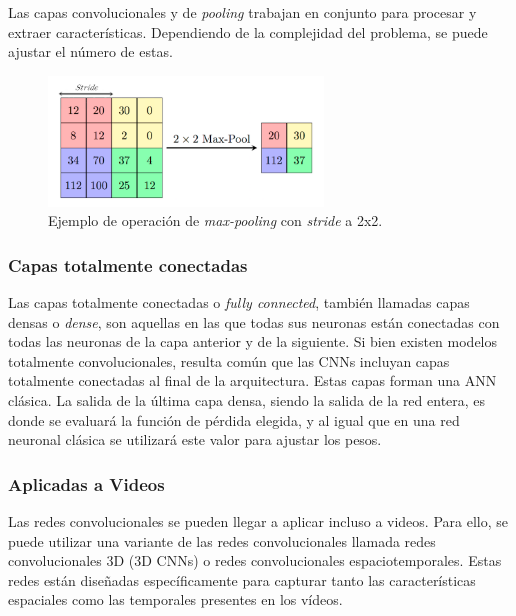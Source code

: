 Las capas convolucionales y de \emph{pooling} trabajan en conjunto para procesar y extraer 
características. 
Dependiendo de la complejidad del problema, se puede ajustar el número de estas.

\begin{figure}[htp]
  \begin{center}
    \includegraphics[width=0.65\textwidth]{imagenes/chapter2/MaxpoolSample.png}
  \end{center}

  \caption{
    Ejemplo de operación de \emph{max-pooling} con \emph{stride} a 2x2.
  }
  \label{fig:PoolingExample}
\end{figure}

\subsubsection{Capas totalmente conectadas}
Las capas totalmente conectadas o \emph{fully connected}, también llamadas 
capas densas o \emph{dense}, son aquellas en las que todas sus neuronas 
están conectadas con todas las neuronas de la capa anterior y de la
siguiente. Si bien existen modelos totalmente convolucionales, resulta común
que las CNNs incluyan capas totalmente conectadas al final de la arquitectura.
Estas capas forman una ANN clásica.
La salida de la última capa densa, siendo la salida de la red entera, es donde
se evaluará la función de pérdida elegida, y al igual que en una red neuronal
clásica se utilizará este valor para ajustar los pesos.

\subsubsection{Aplicadas a Videos} 
\label{sec:VideoCNN}
Las redes convolucionales se pueden llegar a aplicar incluso a videos. 
Para ello, se puede utilizar una variante de las redes convolucionales llamada 
redes convolucionales 3D (3D CNNs) o redes convolucionales espaciotemporales. 
Estas redes están diseñadas específicamente para capturar tanto las características 
espaciales como las temporales presentes en los vídeos.

